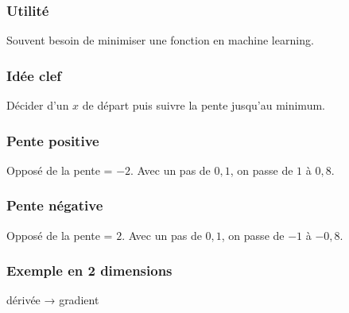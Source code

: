 
\begin{frame}
  \frametitle{Utilité}
  Souvent besoin de minimiser une fonction en machine learning.
\end{frame}

\begin{frame}
  \frametitle{Idée clef}

  Décider d'un $x$ de départ puis suivre la pente jusqu'au minimum.


\end{frame}

\begin{frame}
  \frametitle{Pente positive}


  Opposé de la pente = $-2$. Avec un pas de $0,1$, on passe de $1$ à $0,8$.
\end{frame}

\begin{frame}
  \frametitle{Pente négative}


  Opposé de la pente = $2$. Avec un pas de $0,1$, on passe de $-1$ à $-0,8$.
\end{frame}

\begin{frame}
  \frametitle{Exemple en 2 dimensions}
  dérivée → gradient
\end{frame}
